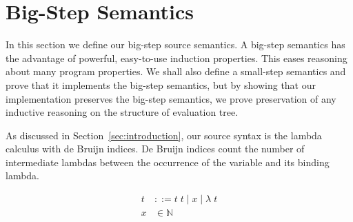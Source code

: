 \section{\ce Big-Step Semantics} \label{sec:cem_big}

In this section we define our big-step source semantics. A big-step semantics
has the advantage of powerful, easy-to-use induction properties. This eases
reasoning about many program properties. We shall also define a small-step
semantics and prove that it implements the big-step semantics, but by showing
that our implementation preserves the big-step semantics, we prove preservation
of any inductive reasoning on the structure of evaluation tree.  

As discussed in Section~\ref{sec:introduction}, our source syntax is the lambda
calculus with de Bruijn indices. De Bruijn indices count the number of
intermediate lambdas between the occurrence of the variable and its binding
lambda.  

\begin{align*}
 t &::= t \; t \; | \; x \; | \;  \lambda \; t \\
 x &\in \mathbb{N}
\end{align*}

